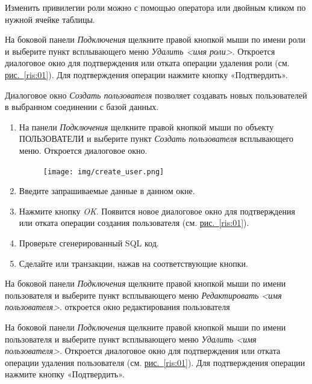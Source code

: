 Изменить привилегии роли можно с помощью оператора  или двойным кликом по нужной ячейке таблицы. 

На боковой панели \textit{Подключения} щелкните правой кнопкой мыши по имени роли и выберите пункт всплывающего меню \textit{Удалить <имя роли>}. Откроется  диалоговое окно для подтверждения или отката операции удаления роли (см. \hyperref[ris:01]{рис.~\ref{ris:01}}). Для подтверждения операции нажмите кнопку «Подтвердить».



Диалоговое окно \textit{Создать пользователя} позволяет создавать новых пользователей в выбранном соединении с базой данных.

\begin{enumerate}[leftmargin=26pt]
	\item На панели \textit{Подключения} щелкните правой кнопкой мыши по объекту ПОЛЬЗОВАТЕЛИ и выберите пункт \textit{Создать пользователя} всплывающего меню. Откроется диалоговое окно.
	\begin{figure}[H]
		\centering
		\texttt{[image: img/create\_user.png]}
	\end{figure}
	\item Введите запрашиваемые данные в данном окне.
	\item Нажмите кнопку \textit{OK}. Появится новое диалоговое окно для подтверждения или отката операции создания пользователя (см. \hyperref[ris:01]{рис.~\ref{ris:01}}).
	\item Проверьте сгенерированный SQL код.
	\item Сделайте  или  транзакции, нажав на соответствующие кнопки.
\end{enumerate}

На боковой панели \textit{Подключения} щелкните правой кнопкой мыши по имени пользователя и выберите пункт всплывающего меню \textit{Редактировать <имя пользователя>}. откроется окно редактирования пользователя

На боковой панели \textit{Подключения} щелкните правой кнопкой мыши по имени пользователя и выберите пункт всплывающего меню \textit{Удалить <имя пользователя>}. Откроется  диалоговое окно для подтверждения или отката операции удаления пользователя (см. \hyperref[ris:01]{рис.~\ref{ris:01}}). Для подтверждения операции нажмите кнопку «Подтвердить».

